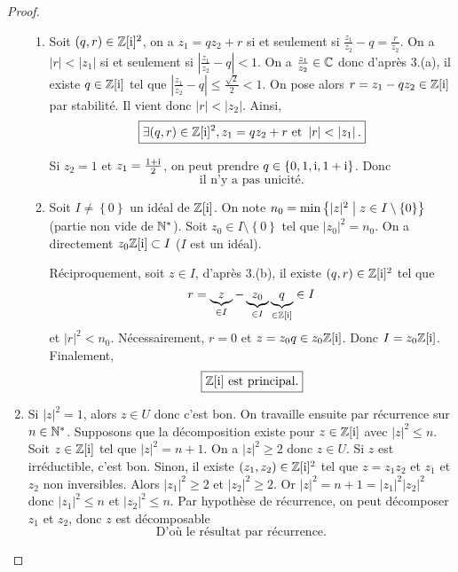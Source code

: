 \begin{proof}
\begin{enumerate}
\begin{enumerate}
			\item Soit $(q,r)\in\mathbb{Z}[\mathrm{i}]^{2}$, on a $z_{1}=qz_{2}+r$ si et seulement si $\frac{z_{1}}{z_{2}}-q=\frac{r}{z_{2}}$. On a $\vert r\vert<\vert z_{1}\vert$ si et seulement si $\left\vert\frac{z_{1}}{z_{2}}-q\right\vert<1$.
			On a $\frac{z_{1}}{z_{2}}\in\mathbb{C}$ donc d'après 3.(a), il existe $q\in\mathbb{Z}[\mathrm{i}]$ tel que $\left\lvert \frac{z_{1}}{z_{2}}-q\right\rvert\leqslant\frac{\sqrt{2}}{2}<1$. On pose alors $r=z_{1}-qz_{2}\in\mathbb{Z}[\mathrm{i}]$ par stabilité. Il vient donc $\vert r\vert<\vert z_{2}\vert$. Ainsi,
			\begin{equation}
				\boxed{\exists(q,r)\in\mathbb{Z}[\mathrm{i}]^{2},z_{1}=qz_{2}+r\text{ et }\left\lvert r\right\rvert<\left\lvert z_{1}\right\rvert.}
			\end{equation}

			Si $z_{2}=1$ et $z_{1}=\frac{1+\mathrm{i}}{2}$, on peut prendre $q\in\left\{0,1,\mathrm{i},1+\mathrm{i}\right\}$.
			Donc 
			\begin{equation}
				\boxed{\text{il n'y a pas unicité.}}
			\end{equation}

			\item Soit $I\neq\left\{0\right\}$ un idéal de $\mathbb{Z}[\mathrm{i}]$. On note $n_{0}=\min\left\{\vert z\vert^{2}\bigm| z\in I\setminus\left\{0\right\}\right\}$ (partie non vide de $\mathbb{N}^{*}$). Soit $z_{0}\in I\setminus\left\{0\right\}$ tel que $\vert z_{0}\vert^{2}=n_{0}$. On a directement $z_{0}\mathbb{Z}[\mathrm{i}]\subset I$ ($I$ est un idéal). 
			
			Réciproquement, soit $z\in I$, d'après 3.(b), il existe $(q,r)\in\mathbb{Z}[\mathrm{i}]^{2}$ tel que 
			\begin{equation}
				r=\underbrace{z}_{\in I}-\underbrace{z_{0}}_{\in I}\underbrace{q}_{\in\mathbb{Z}[\mathrm{i}]}\in I
			\end{equation} 
			et $\vert r\vert^{2}<n_{0}$. Nécessairement, $r=0$ et $z=z_{0}q\in z_{0}\mathbb{Z}[\mathrm{i}]$. Donc $I=z_{0}\mathbb{Z}[\mathrm{i}]$. Finalement, 
			\begin{equation}
				\boxed{\mathbb{Z}[\mathrm{i}]\text{ est principal.}}
			\end{equation}
		\end{enumerate}

		
		\item Si $\vert z\vert^{2}=1$, alors $z\in U$ donc c'est bon. On travaille ensuite par récurrence sur $n\in\mathbb{N}^{*}$. Supposons que la décomposition existe pour $z\in\mathbb{Z}[\mathrm{i}]$ avec $\vert z\vert^{2}\leqslant n$. Soit $z\in\mathbb{Z}[\mathrm{i}]$ tel que $\vert z\vert^{2}=n+1$. On a $\vert z\vert^{2}\geqslant2$ donc $z\in U$. Si $z$ est irréductible, c'est bon. Sinon, il existe $(z_{1},z_{2})\in\mathbb{Z}[\mathrm{i}]^{2}$ tel que $z=z_{1}z_{2}$ et $z_{1}$ et $z_{2}$ non inversibles. Alors $\vert z_{1}\vert^{2}\geqslant2$ et $\vert z_{2}\vert^{2}\geqslant2$. Or $\vert z\vert^{2}=n+1=\vert z_{1}\vert^{2}\vert z_{2}\vert^{2}$ donc $\vert z_{1}\vert^{2}\leqslant n$ et $\vert z_{2}\vert^{2}\leqslant n$. Par hypothèse de récurrence, on peut décomposer $z_{1}$ et $z_{2}$, donc $z$ est décomposable
		\begin{equation}
			\boxed{\text{D'où le résultat par récurrence.}}
		\end{equation}
			

\end{enumerate}
\end{proof}
